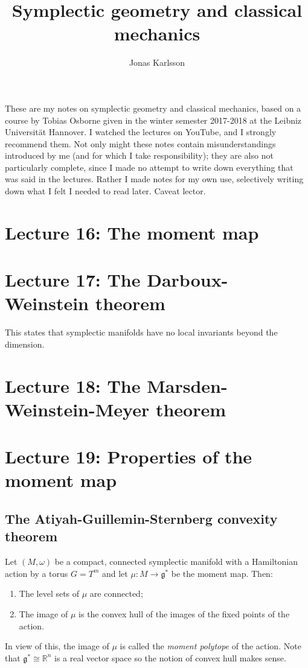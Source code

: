 \documentclass[11pt]{article} %
\title{Symplectic geometry and classical mechanics}
\author{Jonas Karlsson}
\begin{document}
\maketitle
These are my notes on symplectic geometry and classical mechanics, based on a course by Tobias Osborne given in the winter semester 2017-2018 at the Leibniz Universität Hannover. I watched the lectures on YouTube, and I strongly recommend them. Not only might these notes contain misunderstandings introduced by me (and for which I take responsibility); they are also not particularly complete, since I made no attempt to write down everything that was said in the lectures. Rather I made notes for my own use, selectively writing down what I felt I needed to read later. Caveat lector.


\section*{Lecture 16: The moment map} 

\section*{Lecture 17: The Darboux-Weinstein theorem}
This states that symplectic manifolds have no local invariants beyond the dimension. 

\section*{Lecture 18: The Marsden-Weinstein-Meyer theorem}

\section*{Lecture 19: Properties of the moment map}
\subsection*{The Atiyah-Guillemin-Sternberg convexity theorem}
Let $(M, \omega)$ be a compact, connected symplectic manifold with a Hamiltonian action by a torus $G = T^m$ and let $\mu: M \rightarrow \mathfrak{g}^\ast$ be the moment map. Then:
\begin{enumerate}
\item The level sets of $\mu$ are connected;
\item The image of $\mu$ is the convex hull of the images of the fixed points of the action.
\end{enumerate}
In view of this, the image of $\mu$ is called the \emph{moment polytope} of the action. Note that $\mathfrak{g}^\ast \cong \mathbb{R}^n$ is a real vector space so the notion of convex hull makes sense. 
\end{document}
